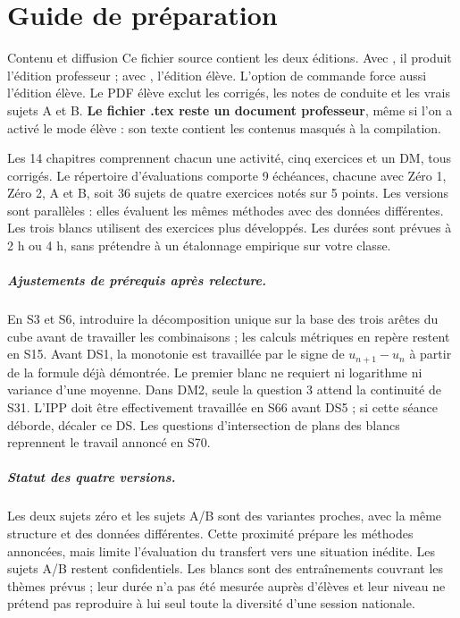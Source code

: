 \chapter*{Guide de préparation}
\begin{profbox}{Contenu et diffusion}
Ce fichier source contient les deux éditions. Avec \texttt{\string\proftrue}, il produit l'édition professeur ; avec \texttt{\string\proffalse}, l'édition élève. L'option de commande \texttt{\string\VERSIONELEVE} force aussi l'édition élève. Le PDF élève exclut les corrigés, les notes de conduite et les vrais sujets A et B. \textbf{Le fichier .tex reste un document professeur}, même si l'on a activé le mode élève : son texte contient les contenus masqués à la compilation.
\end{profbox}
Les 14 chapitres comprennent chacun une activité, cinq exercices et un DM, tous corrigés. Le répertoire d'évaluations comporte 9 échéances, chacune avec Zéro 1, Zéro 2, A et B, soit 36 sujets de quatre exercices notés sur 5 points. Les versions sont parallèles : elles évaluent les mêmes méthodes avec des données différentes. Les trois blancs utilisent des exercices plus développés. Les durées sont prévues à 2 h ou 4 h, sans prétendre à un étalonnage empirique sur votre classe.
\paragraph{Ajustements de prérequis après relecture.} En S3 et S6, introduire la décomposition unique sur la base des trois arêtes du cube avant de travailler les combinaisons ; les calculs métriques en repère restent en S15. Avant DS1, la monotonie est travaillée par le signe de $u_{n+1}-u_n$ à partir de la formule déjà démontrée. Le premier blanc ne requiert ni logarithme ni variance d'une moyenne. Dans DM2, seule la question 3 attend la continuité de S31. L'IPP doit être effectivement travaillée en S66 avant DS5 ; si cette séance déborde, décaler ce DS. Les questions d'intersection de plans des blancs reprennent le travail annoncé en S70.
\paragraph{Statut des quatre versions.} Les deux sujets zéro et les sujets A/B sont des variantes proches, avec la même structure et des données différentes. Cette proximité prépare les méthodes annoncées, mais limite l'évaluation du transfert vers une situation inédite. Les sujets A/B restent confidentiels. Les blancs sont des entraînements couvrant les thèmes prévus ; leur durée n'a pas été mesurée auprès d'élèves et leur niveau ne prétend pas reproduire à lui seul toute la diversité d'une session nationale.
